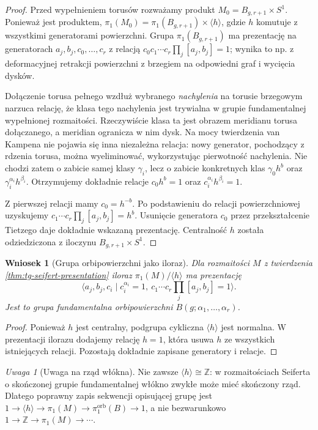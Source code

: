 \documentclass[11pt,a4paper]{report}
\numberwithin{equation}{section}
\theoremstyle{plain}
\newtheorem{wniosek}[twierdzenie]{Wniosek}
\theoremstyle{definition}
\theoremstyle{remark}
\newtheorem{uwaga}[twierdzenie]{Uwaga}
\begin{document}
\begin{proof}
Przed wypełnieniem torusów rozważamy produkt
$M_0=B_{g,r+1}\times S^1$. Ponieważ jest produktem,
$\pi_1(M_0)=\pi_1(B_{g,r+1})\times\langle h\rangle$,
gdzie $h$ komutuje z wszystkimi generatorami
powierzchni. Grupa $\pi_1(B_{g,r+1})$ ma
prezentację na generatorach $a_j,b_j,c_0,\ldots,c_r$
z relacją $c_0c_1\cdots c_r\prod_j[a_j,b_j]=1$;
wynika to np. z deformacyjnej retrakcji powierzchni
z brzegiem na odpowiedni graf i wycięcia dysków.

Dołączenie torusa pełnego wzdłuż wybranego
\emph{nachylenia} na torusie brzegowym narzuca relację,
że klasa tego nachylenia jest trywialna w grupie
fundamentalnej wypełnionej rozmaitości. Rzeczywiście
klasa ta jest obrazem meridianu torusa dołączanego,
a meridian ogranicza w nim dysk. Na mocy twierdzenia
van Kampena nie pojawia się inna niezależna relacja:
nowy generator, pochodzący z rdzenia torusa, można
wyeliminować, wykorzystując pierwotność nachylenia.
Nie chodzi zatem o zabicie samej klasy $\gamma_i$,
lecz o zabicie konkretnych klas
$\gamma_0h^b$ oraz $\gamma_i^{\alpha_i}h^{\beta_i}$.
Otrzymujemy dokładnie relacje $c_0h^b=1$ oraz
$c_i^{\alpha_i}h^{\beta_i}=1$.

Z pierwszej relacji mamy $c_0=h^{-b}$. Po podstawieniu
do relacji powierzchniowej uzyskujemy
$c_1\cdots c_r\prod_j[a_j,b_j]=h^b$.
Usunięcie generatora $c_0$ przez przekształcenie
Tietzego daje dokładnie wskazaną prezentację.
Centralność $h$ została odziedziczona z iloczynu
$B_{g,r+1}\times S^1$.
\end{proof}

\begin{wniosek}[Grupa orbipowierzchni jako iloraz]
Dla rozmaitości $M$ z twierdzenia
\ref{thm:tg-seifert-presentation} iloraz
$\pi_1(M)/\langle h\rangle$ ma prezentację
\[
\big\langle a_j,b_j,c_i\mid c_i^{\alpha_i}=1,
\ c_1\cdots c_r\prod_j[a_j,b_j]=1\big\rangle.
\]
Jest to grupa fundamentalna orbipowierzchni
$B(g;\alpha_1,\ldots,\alpha_r)$.
\end{wniosek}
\begin{proof}
Ponieważ $h$ jest centralny, podgrupa cykliczna
$\langle h\rangle$ jest normalna. W prezentacji
ilorazu dodajemy relację $h=1$, która usuwa $h$
ze wszystkich istniejących relacji. Pozostają dokładnie
zapisane generatory i relacje.
\end{proof}

\begin{uwaga}[Uwaga na rząd włókna]
Nie zawsze $\langle h\rangle\cong\mathbb Z$:
w rozmaitościach Seiferta o skończonej grupie fundamentalnej
włókno zwykłe może mieć skończony rząd. Dlatego poprawny
zapis sekwencji opisującej grupę jest
$1\to\langle h\rangle\to\pi_1(M)\to
\pi_1^{\mathrm{orb}}(B)\to1$,
a nie bezwarunkowo $1\to\mathbb Z\to\pi_1(M)\to\cdots$.
\end{uwaga}
\end{document}
